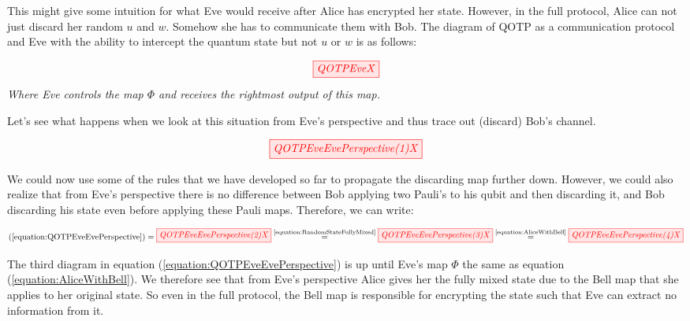 \documentclass[]{article}
\newcommand{\equaltext}[1]{\ensuremath{\stackrel{\text{#1}}{=}}}
\begin{document}
This might give some intuition for what Eve would receive after Alice has encrypted her state. However, in the full protocol, Alice can not just discard her random $u$ and $w$. Somehow she has to communicate them with Bob. The diagram of QOTP as a communication protocol and Eve with the ability to intercept the quantum state but not $u$ or $w$ is as follows:

\begin{equation}
	\tikzfig{QOTPEveX}
\end{equation}
\textit{Where Eve controls the map $\Phi$ and receives the rightmost output of this map.}

Let's see what happens when we look at this situation from Eve's perspective and thus trace out (discard) Bob's channel.

\begin{equation}
	\label{equation:QOTPEveEvePerspective}
	\tikzfig{QOTPEveEvePerspective(1)X}
\end{equation}

We could now use some of the rules that we have developed so far to propagate the discarding map further down. However, we could also realize that from Eve's perspective there is no difference between Bob applying two Pauli's to his qubit and then discarding it, and Bob discarding his state even before applying these Pauli maps. Therefore, we can write: 

\begin{equation}
(\ref{equation:QOTPEveEvePerspective}) = 
\tikzfig{QOTPEveEvePerspective(2)X} \equaltext{\ref{equation:RandomStateFullyMixed}}
\tikzfig{QOTPEveEvePerspective(3)X} \equaltext{\ref{equation:AliceWithBell}}
\tikzfig{QOTPEveEvePerspective(4)X}
\end{equation}

The third diagram in equation (\ref{equation:QOTPEveEvePerspective}) is up until Eve's map $\Phi$ the same as equation (\ref{equation:AliceWithBell}). We therefore see that from Eve's perspective Alice gives her the fully mixed state due to the Bell map that she applies to her original state. So even in the full protocol, the Bell map is responsible for encrypting the state such that Eve can extract no information from it. 
\end{document}
